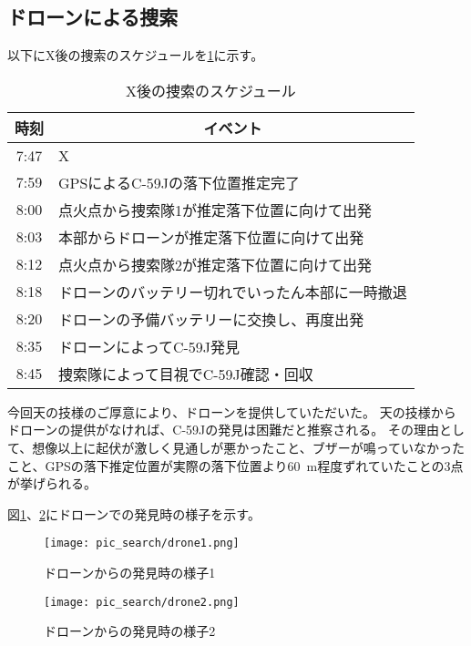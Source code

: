 \documentclass[a4paper,11pt,titlepage,uplatex]{jsarticle}
\begin{document}
\subsection{ドローンによる捜索}
以下にX後の捜索のスケジュールを\ref{tab:find}に示す。

\begin{table}[H]
    \centering
    \caption{X後の捜索のスケジュール}
    \begin{tabular}{cl} \toprule
        時刻 & \multicolumn{1}{c}{イベント}  \\ \midrule
        7:47 & X \\
        7:59 & GPSによるC-59Jの落下位置推定完了 \\
        8:00 & 点火点から捜索隊1が推定落下位置に向けて出発 \\
        8:03 & 本部からドローンが推定落下位置に向けて出発 \\
        8:12 & 点火点から捜索隊2が推定落下位置に向けて出発 \\
        8:18 & ドローンのバッテリー切れでいったん本部に一時撤退 \\
        8:20 & ドローンの予備バッテリーに交換し、再度出発 \\
        8:35 & ドローンによってC-59J発見 \\
        8:45 & 捜索隊によって目視でC-59J確認・回収\\
        \bottomrule
    \end{tabular}
    \label{tab:find}
\end{table}

今回天の技様のご厚意により、ドローンを提供していただいた。
天の技様からドローンの提供がなければ、C-59Jの発見は困難だと推察される。
その理由として、想像以上に起伏が激しく見通しが悪かったこと、ブザーが鳴っていなかったこと、GPSの落下推定位置が実際の落下位置より\SI{60}{m}程度ずれていたことの3点が挙げられる。

図\ref{fig:drone1}、\ref{fig:drone2}にドローンでの発見時の様子を示す。

\begin{figure}[H]
    \centering
    \texttt{[image: pic\_search/drone1.png]}
    \caption{ドローンからの発見時の様子1}
    \label{fig:drone1}
\end{figure}

\begin{figure}[H]
    \centering
    \texttt{[image: pic\_search/drone2.png]}
    \caption{ドローンからの発見時の様子2}
    \label{fig:drone2}
\end{figure}
\end{document}

